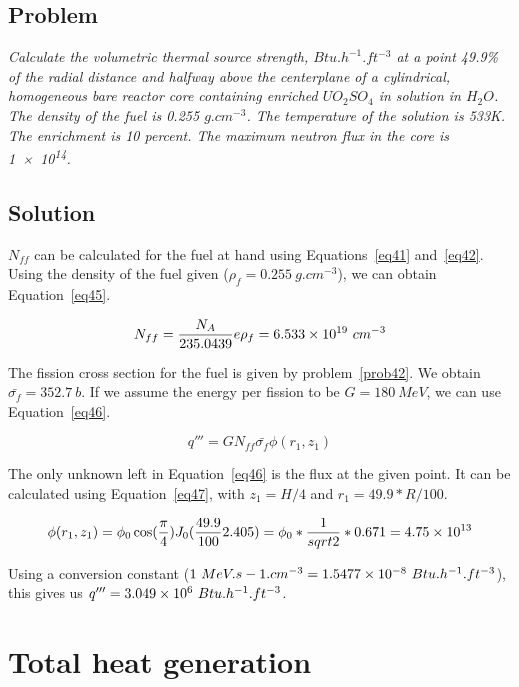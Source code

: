 \subsection{Problem}
\textit{Calculate the volumetric thermal source strength, $Btu.h^{-1}.ft^{-3}$ at a point 49.9\% of the radial distance and halfway above the centerplane of a cylindrical, homogeneous bare reactor core containing enriched $UO_2SO_4$ in solution in $H_2O$. The density of the fuel is 0.255 $g.cm^{-3}$. The temperature of the solution is 533K. The enrichment is 10 percent. The maximum neutron flux in the core is \num{1e14}.}

\subsection{Solution}

$N_{ff}$ can be calculated for the fuel at hand using Equations~\ref{eq41} and~\ref{eq42}. Using the density of the fuel given ($\rho_f = 0.255\ g.cm^{-3}$), we can obtain Equation~\ref{eq45}.

\begin{equation}\label{eq45}
N_{ff} = \frac{N_A}{235.0439}e\rho_{f} = \text{\num{6.533e19}}\ cm^{-3}
\end{equation}

The fission cross section for the fuel is given by problem~\ref{prob42}. We obtain $\bar{\sigma_{f}} = 352.7\ b$. If we assume the energy per fission to be $G = 180\ MeV$, we can use Equation~\ref{eq46}.

\begin{equation}\label{eq46}
q''' = G N_{ff} \bar{\sigma_{f}} \phi(r_1, z_1)
\end{equation}

The only unknown left in Equation~\ref{eq46} is the flux at the given point. It can be calculated using Equation~\ref{eq47}, with $z_1 = H/4$ and $r_1 = 49.9*R/100$.

\begin{equation}\label{eq47}
\phi(r_1, z_1) = \phi_0 \cos(\frac{\pi}{4}) J_0(\frac{49.9}{100}2.405) = \phi_0 * \frac{1}{sqrt{2}} * 0.671 = \text{\num{4.75e13}}
\end{equation}

Using a conversion constant ($1\ MeV.s-1.cm^{-3} = \text{\num{1.5477e-8}}\ Btu.h^{-1}.ft^{-3}$), this gives us $q''' = \text{\num{3.049e6}}\ Btu.h^{-1}.ft^{-3}$.



\section{Total heat generation}
\label{prob44}


